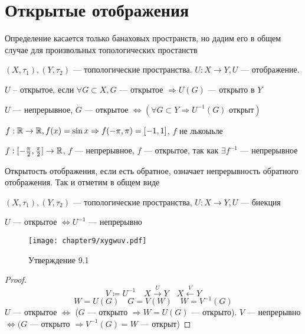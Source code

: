 \documentclass[document]{subfiles}
\begin{document}
\section{Открытые отображения}

Определение касается только банаховых пространств, но дадим его в общем случае для произвольных топологических простанств

\begin{definition}
    $(X, \tau_1), (Y, \tau_2)$ --- топологические пространства. $U: X \rightarrow Y, U$ --- отображение.

    $U$ -- открытое, если $\forall G \subset X, G$ --- открытое $\Rightarrow U(G)$ --- открыто в $Y$
    
\end{definition}

\begin{remark}
    $U$ --- непрерывное, $G$ --- открытое $\Leftrightarrow (\forall G \subset Y \Rightarrow U^{-1}(G) \text{ открыт})$
\end{remark}

\begin{example}
    $f: \mathbb{R} \rightarrow \mathbb{R}, f(x) = \sin x \Rightarrow f(-\pi,\pi) = [-1,1]$, $f$ не лькоыьле
\end{example}

\begin{example}
    $f: [-\frac{\pi}{2}, \frac{\pi}{2}] \rightarrow \mathbb{R}$, $f$ --- непрерывное, $f$ --- открытое, так как $\exists f^{-1}$ --- непрерывное
\end{example}


Открытость отображения, если есть обратное, означает непрерывность обратного отображения. Так и отметим в общем виде 

\begin{statement}
    $(X, \tau_1), (Y, \tau_2)$ --- топологические пространства, $U: X \rightarrow Y, U$ --- биекция 

    $U$ --- открытое $\Leftrightarrow U^{-1}$ --- непрерывно
\end{statement}
\begin{figure}
    \texttt{[image: chapter9/xygwuv.pdf]}\caption{Утверждение 9.1}
\end{figure}
\begin{proof}
    \[V \coloneqq U^{-1} \quad X \stackrel{U}{\longrightarrow} Y \quad X \stackrel{V}{\longleftarrow} Y \]
    \[ W = U(G) \quad G = V(W) \quad W = V^{-1}(G) \] 
    $U$ --- открытое $\Leftrightarrow$ ($G$ --- открыто $\Rightarrow W = U(G)$ --- открыто).
    $V$ --- непрерывно $\Leftrightarrow (G$ --- открыто $\Rightarrow V^{-1}(G) = W$ --- открыт)
\end{proof}
\end{document}
